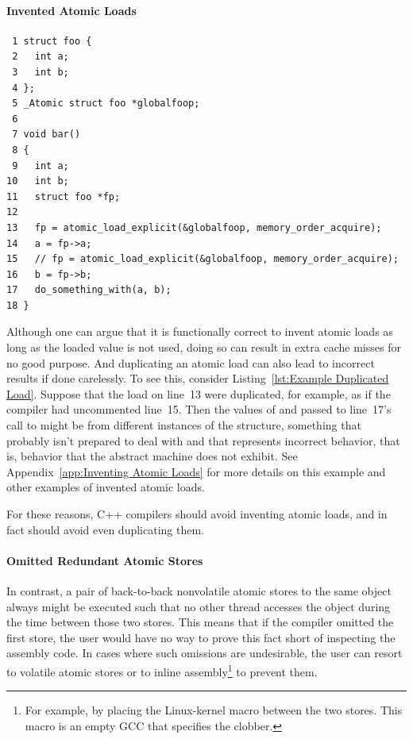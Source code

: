 \documentclass[10]{article}
\begin{document}
\paragraph{Invented Atomic Loads}
\begin{listing}[tbp]
\scriptsize
\begin{verbatim}
 1 struct foo {
 2   int a;
 3   int b;
 4 };
 5 _Atomic struct foo *globalfoop;
 6
 7 void bar()
 8 {
 9   int a;
10   int b;
11   struct foo *fp;
12
13   fp = atomic_load_explicit(&globalfoop, memory_order_acquire);
14   a = fp->a;
15   // fp = atomic_load_explicit(&globalfoop, memory_order_acquire);
16   b = fp->b;
17   do_something_with(a, b);
18 }
\end{verbatim}
\caption{Example Duplicated Load}
\label{lst:Example Duplicated Load}
\end{listing}
Although one can argue that it is functionally correct to invent atomic
loads as long as the loaded value is not used, doing so can result in
extra cache misses for no good purpose.
And duplicating an atomic load can also lead to incorrect results if done
carelessly.
To see this, consider
Listing~\ref{lst:Example Duplicated Load}.
Suppose that the load on line~13 were duplicated, for example, as if the
compiler had uncommented line~15.
Then the values of  and  passed to line~17's call to
 might be from different instances of the
 structure, something that  probably
isn't prepared to deal with and that represents incorrect behavior,
that is, behavior that the abstract machine does not exhibit.
See
Appendix~\ref{app:Inventing Atomic Loads}
for more details on this example and other examples of invented
atomic loads.

For these reasons, C++ compilers should avoid inventing atomic
loads, and in fact should avoid even duplicating them.

\paragraph{Omitted Redundant Atomic Stores}
In contrast, a pair of back-to-back nonvolatile atomic stores to the
same object
always might be executed such that no other thread accesses the object
during the time between those two stores.
This means that if the compiler omitted the first store,
the user would have no way to prove this fact short of
inspecting the assembly code.
In cases where such omissions are undesirable, the user can resort to
volatile atomic stores or to inline assembly\footnote{
	For example, by placing the Linux-kernel  macro
	between the two stores.
	This macro is an empty GCC  that specifies the 
	clobber.}
to prevent them.
\end{document}
